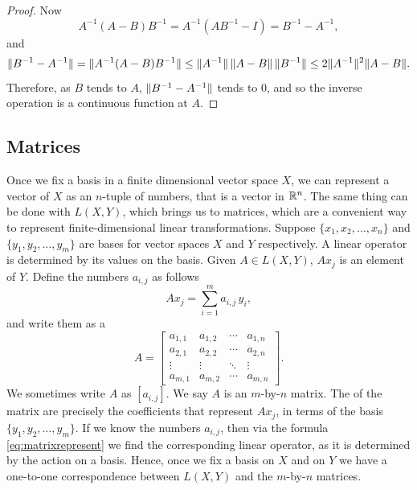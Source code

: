 \begin{proof}
Now
\begin{equation*}
A^{-1}(A-B)B^{-1} = 
A^{-1}(AB^{-1}-I) = 
B^{-1}-A^{-1} ,
\end{equation*}
and
\begin{equation*}
\lVert {B^{-1}-A^{-1}} \rVert =
\lVert {A^{-1}(A-B)B^{-1}} \rVert \leq
\lVert {A^{-1}} \rVert\,\lVert {A-B} \rVert\,\lVert {B^{-1}} \rVert
\leq
2\lVert {A^{-1}} \rVert^2
\lVert {A-B} \rVert .
\end{equation*}
Therefore, as $B$ tends to $A$, $\lVert {B^{-1}-A^{-1}} \rVert$ tends to 0, and
so the inverse operation is a continuous function at $A$.
\end{proof}

\subsection{Matrices}

Once we fix a basis in a finite dimensional
vector space $X$, we can represent a vector of $X$ as an $n$-tuple of
numbers, that is a vector in ${\mathbb{R}}^n$.  The same thing
can be done with $L(X,Y)$, which brings us to matrices,
which are a convenient way to represent
finite-dimensional linear transformations.
Suppose $\{ x_1, x_2, \ldots, x_n \}$ and $\{ y_1, y_2, \ldots, y_m \}$
are bases for vector spaces $X$ and $Y$ respectively.  A linear operator is 
determined by its values on the basis.  Given $A \in L(X,Y)$,
$A x_j$ is an element of $Y$.  Define the numbers
$a_{i,j}$ as follows
\begin{equation} \label{eq:matrixrepresent}
A x_j = \sum_{i=1}^m a_{i,j} \, y_i ,
\end{equation}
and write them as a \emph{}
\begin{equation*}
A =
\begin{bmatrix}
a_{1,1} & a_{1,2} & \cdots & a_{1,n} \\
a_{2,1} & a_{2,2} & \cdots & a_{2,n} \\
\vdots & \vdots & \ddots & \vdots \\
a_{m,1} & a_{m,2} & \cdots & a_{m,n}
\end{bmatrix} .
\end{equation*}
We sometimes write $A$ as $[a_{i,j}]$.
We say $A$ is an $m$-by-$n$ matrix.
The \emph{} of the matrix are precisely the coefficients
that represent $A x_j$, in terms of the basis $\{ y_1,y_2,\ldots,y_m \}$.
If we know the numbers $a_{i,j}$, then via the formula
\eqref{eq:matrixrepresent} we find the corresponding linear operator,
as it is determined by the action on a basis.  Hence, once we fix
a basis on $X$ and on $Y$ we have a one-to-one correspondence between
$L(X,Y)$ and the $m$-by-$n$ matrices.

